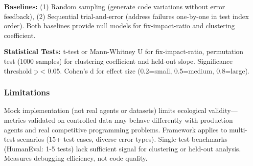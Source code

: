 \textbf{Baselines:} (1) Random sampling (generate code variations without error feedback), (2) Sequential trial-and-error (address failures one-by-one in test index order). Both baselines provide null models for fix-impact-ratio and clustering coefficient.

\textbf{Statistical Tests:} t-test or Mann-Whitney U for fix-impact-ratio, permutation test (1000 samples) for clustering coefficient and held-out slope. Significance threshold p < 0.05. Cohen's d for effect size (0.2=small, 0.5=medium, 0.8=large).

\subsubsection{Limitations}

Mock implementation (not real agents or datasets) limits ecological validity---metrics validated on controlled data may behave differently with production agents and real competitive programming problems. Framework applies to multi-test scenarios (15+ test cases, diverse error types). Single-test benchmarks (HumanEval: 1-5 tests) lack sufficient signal for clustering or held-out analysis. Measures debugging efficiency, not code quality.
